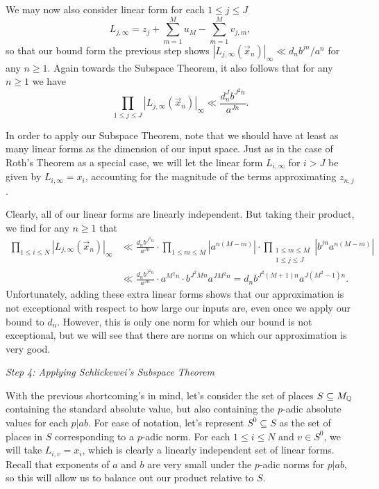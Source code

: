 We may now also consider linear form for each $1 \leq j \leq J$
\[
    L_{j, \infty}
    = z_j 
        + \sum_{m = 1}^M u_M
        - \sum_{m = 1}^M v_{j,m},
\]
so that our bound form the previous step shows $|L_{j, \infty}(\vec{x}_n)|_\infty \ll d_n b^{jn} / a^{n}$ for any $n \geq 1$.
Again towards the Subspace Theorem,
it also follows that for any $n \geq 1$ we have
\[
    \prod_{1 \leq j \leq J}
        |L_{j, \infty}(\vec{x}_n)|_\infty
    \ll \frac{d_n^J b^{J^2n}}{a^{Jn}}.
\]

In order to apply our Subspace Theorem,
note that we should have at least as many linear forms as the dimension of our input space.
Just as in the case of Roth's Theorem as a special case,
we will let the linear form $L_{i,\infty}$ for $i > J$ be given by $L_{i, \infty} = x_i$, 
accounting for the magnitude of the terms approximating $z_{n,j}$.

Clearly, all of our linear forms are linearly independent.
But taking their product, we find for any $n \geq 1$ that
\begin{align*}
    \prod_{1 \leq i \leq N} |L_{j, \infty}(\vec{x}_n)|_\infty
    & \ll \frac{d_n b^{J^2n}}{a^{Jn}}
        \cdot \prod_{1 \leq m \leq M} |a^{n(M - m)}|
        \cdot \prod_{\substack{
            1 \leq m \leq M \\
            1 \leq j \leq J
        }} |b^{jn}a^{n(M - m)}| \\
    & \ll \frac{d_n b^{J^2n}}{a^{Jn}}
        \cdot a^{M^2n}
        \cdot b^{J^2Mn}a^{JM^2n}
    = d_n b^{J^2(M + 1)n}a^{J(M^2 - 1)n}.
\end{align*}
Unfortunately, adding these extra linear forms shows that our approximation is not exceptional with respect to how large our inputs are,
even once we apply our bound to $d_n$.
However, this is only one norm for which our bound is not exceptional,
but we will see that there are norms on which our approximation is very good.

\noindent\textit{Step 4: Applying Schlickewei's Subspace Theorem}

With the previous shortcoming's in mind,
let's consider the set of places $S \subseteq M_{\mathbb{Q}}$ containing the standard absolute value,
but also containing the $p$-adic absolute values for each $p | ab$.
For ease of notation, let's represent $S^0 \subseteq S$ as the set of places in $S$ corresponding to a $p$-adic norm.
For each $1 \leq i \leq N$ and $v \in S^0$,
we will take $L_{i, v} = x_i$, which is clearly a linearly independent set of linear forms.
Recall that exponents of $a$ and $b$ are very small under the $p$-adic norms for $p | ab$,
so this will allow us to balance out our product relative to $S$.

